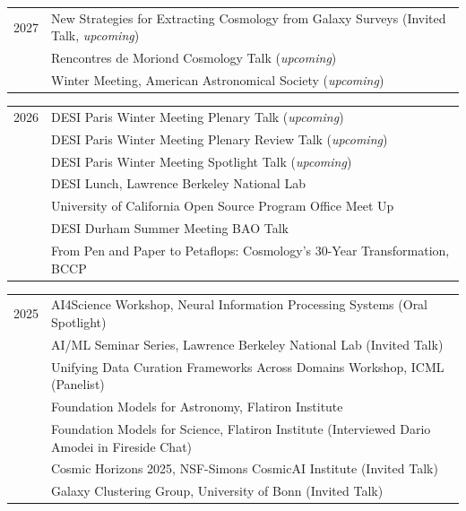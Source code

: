 \begin{tabular}{l @{\hspace{4ex}} l}
2027
& New Strategies for Extracting Cosmology from Galaxy Surveys (Invited Talk, \textit{upcoming})\\
& Rencontres de Moriond Cosmology Talk (\textit{upcoming})\\
& Winter Meeting, American Astronomical Society (\textit{upcoming})
\end{tabular}\par\vspace{-0.35em}
\begin{tabular}{l @{\hspace{4ex}} l}
2026
& DESI Paris Winter Meeting Plenary Talk (\textit{upcoming})\\
& DESI Paris Winter Meeting Plenary Review Talk (\textit{upcoming})\\
& DESI Paris Winter Meeting Spotlight Talk (\textit{upcoming})\\
& DESI Lunch, Lawrence Berkeley National Lab\\
& University of California Open Source Program Office Meet Up\\
& DESI Durham Summer Meeting BAO Talk\\
& From Pen and Paper to Petaflops: Cosmology's 30-Year Transformation, BCCP
\end{tabular}\par\vspace{-0.35em}
\begin{tabular}{l @{\hspace{4ex}} l}
2025
& AI4Science Workshop, Neural Information Processing Systems (Oral Spotlight)\\
& AI/ML Seminar Series, Lawrence Berkeley National Lab (Invited Talk)\\
& Unifying Data Curation Frameworks Across Domains Workshop, ICML (Panelist)\\
& Foundation Models for Astronomy, Flatiron Institute\\
& Foundation Models for Science, Flatiron Institute (Interviewed Dario Amodei in Fireside Chat)\\
& Cosmic Horizons 2025, NSF-Simons CosmicAI Institute (Invited Talk)\\
& Galaxy Clustering Group, University of Bonn (Invited Talk)
\end{tabular}\par\vspace{-0.35em}
